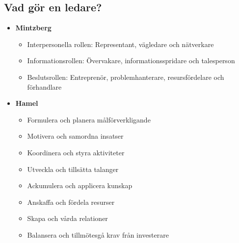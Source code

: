 \subsection{Vad gör en ledare?}
\begin{itemize}
    \item \textbf{Mintzberg}
    \begin{itemize}
        \item Interpersonella rollen: \newline
        Representant, vägledare och nätverkare
        \item Informationsrollen: \newline
        Övervakare, informationsspridare och talesperson
        \item Beslutsrollen: \newline
        Entreprenör, problemhanterare, resursfördelare och förhandlare
    \end{itemize}
    \item \textbf{Hamel}
    \begin{itemize}
        \item Formulera och planera målförverkligande
        \item Motivera och samordna insatser
        \item Koordinera och styra aktiviteter
        \item Utveckla och tillsätta talanger
        \item Ackumulera och applicera kunskap
        \item Anskaffa och fördela resurser
        \item Skapa och vårda relationer
        \item Balansera och tillmötesgå krav från investerare
    \end{itemize}
\end{itemize}

